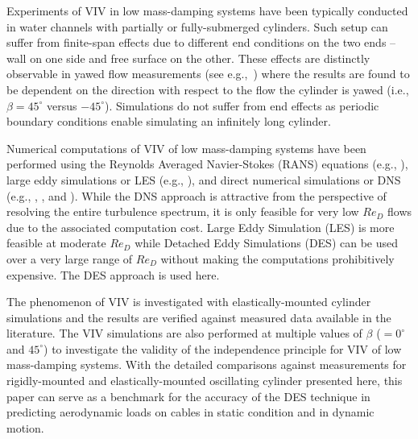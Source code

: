 Experiments of VIV in low mass-damping systems have been typically conducted in
water channels with partially or fully-submerged cylinders. Such setup can
suffer from finite-span effects due to different end conditions on the two ends
-- wall on one side and free surface on the other. These effects are distinctly
observable in yawed flow measurements (see e.g.,~\citet{franzini2013one}) where
the results are found to be dependent on the direction with respect to the flow
the cylinder is yawed (i.e., $\beta=45^\circ$ versus $-45^\circ$). Simulations
do not suffer from end effects as periodic boundary conditions enable
simulating an infinitely long cylinder. 

Numerical computations of VIV of low mass-damping systems have been performed
using the Reynolds Averaged Navier-Stokes (RANS) equations (e.g.,
\citet{guilmineau2004numerical}), large eddy simulations or LES (e.g.,
\citet{al2004vortex}), and direct numerical simulations or DNS (e.g.,
\citet{lucor2005vortex}, \citet{evangelinos2000dns}, and \citet{dong2005dns}).
While the DNS approach is attractive from the perspective of resolving the
entire turbulence spectrum, it is only feasible for very low $Re_D$ flows due
to the associated computation cost. Large Eddy Simulation (LES) is more
feasible at moderate $Re_D$ while Detached Eddy Simulations (DES) can be used
over a very large range of $Re_D$ without making the computations prohibitively
expensive. The DES approach is used here.

The phenomenon of VIV is investigated with elastically-mounted cylinder
simulations and the results are verified against measured data available in the
literature. The VIV simulations are also performed at multiple values of
$\beta$ ($=0^\circ$ and $45^\circ$) to investigate the validity of the
independence principle for VIV of low mass-damping systems. With the detailed
comparisons against measurements for rigidly-mounted and elastically-mounted
oscillating cylinder presented here, this paper can serve as a benchmark for
the accuracy of the DES technique in predicting aerodynamic loads on cables in
static condition and in dynamic motion.
